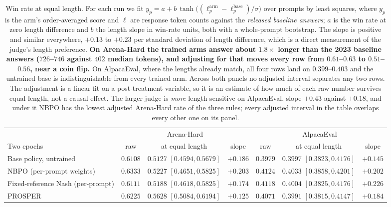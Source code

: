 \documentclass{article}
\theoremstyle{remark}
\theoremstyle{plain}
\begin{document}
\begin{table}[H]
\centering\small
\caption{Win rate at equal length. For each run we fit
$y_p = a + b\,\tanh\!\big((\ell^{\text{arm}}_p-\ell^{\text{base}}_p)/\sigma\big)$
over prompts by least squares, where $y_p$ is the arm's order-averaged score and
$\ell$ are response token counts against the \emph{released baseline answers};
$a$ is the win rate at zero length difference and $b$ the length slope in
win-rate units, both with a whole-prompt bootstrap. The slope is positive and
similar everywhere, $+0.13$ to $+0.23$ per standard deviation of length
difference, which is a direct measurement of the judge's length preference.
\textbf{On Arena-Hard the trained arms answer about $1.8\times$ longer than the
2023 baseline answers ($726$--$746$ against $402$ median tokens), and adjusting
for that moves every row from $0.61$--$0.63$ to $0.51$--$0.56$, near a coin
flip.} On AlpacaEval, where the lengths already match, all four rows land on
$0.399$--$0.403$ and the untrained base is indistinguishable from every trained
arm. Across both panels no adjusted interval separates any two rows. The
adjustment is a linear fit on a post-treatment variable, so it is an estimate of
how much of each raw number survives equal length, not a causal effect. The larger judge is \emph{more} length-sensitive on AlpacaEval, slope $+0.43$ against $+0.18$, and under it NBPO has the lowest adjusted Arena-Hard rate of the three rules; every adjusted interval in the table overlaps every other one on its panel.}
\label{tab:prosper-setting-lengthadjusted}
\begin{tabular}{lcccccc}
\toprule
& \multicolumn{3}{c}{Arena-Hard} & \multicolumn{3}{c}{AlpacaEval}\\
\cmidrule(lr){2-4}\cmidrule(lr){5-7}
Two epochs & raw & at equal length & slope & raw & at equal length & slope\\
\midrule
Base policy, untrained & $0.6108$ & $0.5127$ \tiny{$[0.4594,0.5679]$} & $+0.186$ & $0.3979$ & $0.3997$ \tiny{$[0.3823,0.4176]$} & $+0.145$\\
NBPO (per-prompt weights) & $\mathbf{0.6333}$ & $0.5227$ \tiny{$[0.4651,0.5825]$} & $+0.203$ & $\mathbf{0.4124}$ & $\mathbf{0.4033}$ \tiny{$[0.3858,0.4201]$} & $+0.202$\\
Fixed-reference Nash (per-prompt) & $0.6111$ & $0.5188$ \tiny{$[0.4618,0.5825]$} & $+0.174$ & $0.4118$ & $0.4004$ \tiny{$[0.3825,0.4176]$} & $+0.226$\\
PROSPER \citep{zhang2026prosper} & $0.6225$ & $\mathbf{0.5628}$ \tiny{$[0.5084,0.6194]$} & $+0.125$ & $0.4071$ & $0.3991$ \tiny{$[0.3815,0.4147]$} & $+0.184$\\

\end{tabular}
\end{table}
\end{document}
